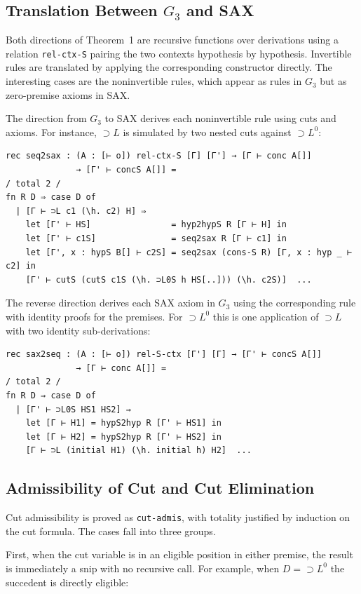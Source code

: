 \subsection{Translation Between $G_3$ and SAX}

Both directions of Theorem~1 are recursive functions over derivations
using a relation \texttt{rel-ctx-S} pairing the two contexts hypothesis
by hypothesis. Invertible rules are translated by applying the
corresponding constructor directly. The interesting cases are the
noninvertible rules, which appear as rules in $G_3$ but as zero-premise
axioms in SAX.

The direction from $G_3$ to SAX derives each noninvertible rule using
cuts and axioms. For instance, ${\supset}L$ is simulated by two nested
cuts against ${\supset}L^0$:

\begin{lstlisting}
rec seq2sax : (A : [⊢ o]) rel-ctx-S [Γ] [Γ'] → [Γ ⊢ conc A[]]
              → [Γ' ⊢ concS A[]] =
/ total 2 /
fn R D ⇒ case D of
  | [Γ ⊢ ⊃L c1 (\h. c2) H] ⇒
    let [Γ' ⊢ HS]                = hyp2hypS R [Γ ⊢ H] in
    let [Γ' ⊢ c1S]               = seq2sax R [Γ ⊢ c1] in
    let [Γ', x : hypS B[] ⊢ c2S] = seq2sax (cons-S R) [Γ, x : hyp _ ⊢ c2] in
    [Γ' ⊢ cutS (cutS c1S (\h. ⊃L0S h HS[..])) (\h. c2S)]  ...
\end{lstlisting}

The reverse direction derives each SAX axiom in $G_3$ using the
corresponding rule with identity proofs for the premises. For
${\supset}L^0$ this is one application of ${\supset}L$ with two identity
sub-derivations:

\begin{lstlisting}
rec sax2seq : (A : [⊢ o]) rel-S-ctx [Γ'] [Γ] → [Γ' ⊢ concS A[]]
              → [Γ ⊢ conc A[]] =
/ total 2 /
fn R D ⇒ case D of
  | [Γ' ⊢ ⊃L0S HS1 HS2] ⇒
    let [Γ ⊢ H1] = hypS2hyp R [Γ' ⊢ HS1] in
    let [Γ ⊢ H2] = hypS2hyp R [Γ' ⊢ HS2] in
    [Γ ⊢ ⊃L (initial H1) (\h. initial h) H2]  ...
\end{lstlisting}

\subsection{Admissibility of Cut and Cut Elimination}

Cut admissibility is proved as \texttt{cut-admis}, with totality
justified by induction on the cut formula. The cases fall into three
groups.

First, when the cut variable is in an eligible position in either
premise, the result is immediately a snip with no recursive call. For
example, when $D = {\supset}L^0$ the succedent is directly eligible:

